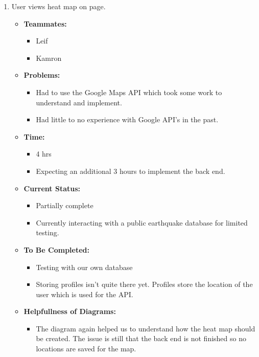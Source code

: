 \documentclass[12pt]{article}
\begin{document}
\begin{enumerate}
\begin{enumerate}
  \begin{enumerate}
    \item User views heat map on page.
      \begin{itemize}
        \item \textbf{Teammates:}
          \begin{itemize}
            \item Leif
            \item Kamron
          \end{itemize}
        \item \textbf{Problems:}
          \begin{itemize}
            \item Had to use the Google Maps API which took some work to understand and implement.
            \item Had little to no experience with Google API’s in the past.
          \end{itemize}
        \item \textbf{Time:}
          \begin{itemize}
            \item 4 hrs
            \item Expecting an additional 3 hours to implement the back end.
          \end{itemize}
        \item \textbf{Current Status:}
          \begin{itemize}
            \item Partially complete
            \item Currently interacting with a public earthquake database for limited testing.
          \end{itemize}
        \item \textbf{To Be Completed:}
          \begin{itemize}
            \item Testing with our own database
            \item Storing profiles isn’t quite there yet. Profiles store the location of the user which is used for the API.
          \end{itemize}
        \item \textbf{Helpfullness of Diagrams:}
          \begin{itemize}
            \item The diagram again helped us to understand how the heat map should be created. The issue is still that the back end is not finished so no locations are saved for the map.
          \end{itemize}
      \end{itemize}


\end{enumerate}
\end{enumerate}
\end{enumerate}
\end{document}
